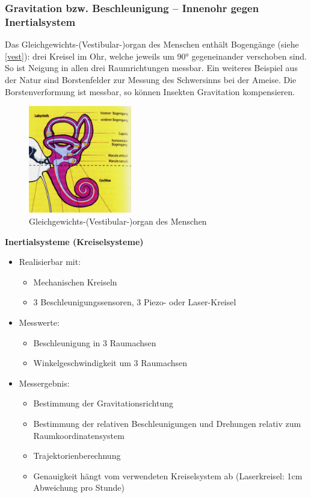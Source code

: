\subsubsection{Gravitation bzw. Beschleunigung – Innenohr gegen Inertialsystem}
Das Gleichgewichts-(Vestibular-)organ des Menschen enthält Bogengänge (siehe \autoref{vest}): drei Kreisel im Ohr, welche jeweils um 90° gegeneinander verschoben sind. So ist Neigung in allen drei Raumrichtungen messbar. Ein weiteres Beispiel aus der Natur sind Borstenfelder zur Messung des Schwersinns bei der Ameise. Die Borstenverformung ist messbar, so können Insekten Gravitation kompensieren.
\begin{figure}[h!]
	\centering
	\includegraphics[width=0.4\textwidth]{figures/ch04_vestibular.png}
	\caption{Gleichgewichts-(Vestibular-)organ des Menschen}
	\label{vest}
\end{figure}
\noindent
\textbf{Inertialsysteme (Kreiselsysteme)}
\begin{itemize}
\setlength\itemsep{0em}
\item Realisierbar mit:
\begin{itemize}
\setlength\itemsep{0em}
\item Mechanischen Kreiseln
\item 3 Beschleunigungssensoren, 3 Piezo- oder Laser-Kreisel
\end{itemize}
\item Messwerte:
\begin{itemize}
\setlength\itemsep{0em}
\item Beschleunigung in 3 Raumachsen
\item Winkelgeschwindigkeit um 3 Raumachsen
\end{itemize}
\item Messergebnis:
\begin{itemize}
\setlength\itemsep{0em}
\item Bestimmung der Gravitationsrichtung
\item Bestimmung der relativen Beschleunigungen und Drehungen relativ zum Raumkoordinatensystem
\item  Trajektorienberechnung
\item Genauigkeit hängt vom verwendeten Kreiselsystem ab (Laserkreisel: 1cm Abweichung pro Stunde)
\end{itemize}
\end{itemize}
